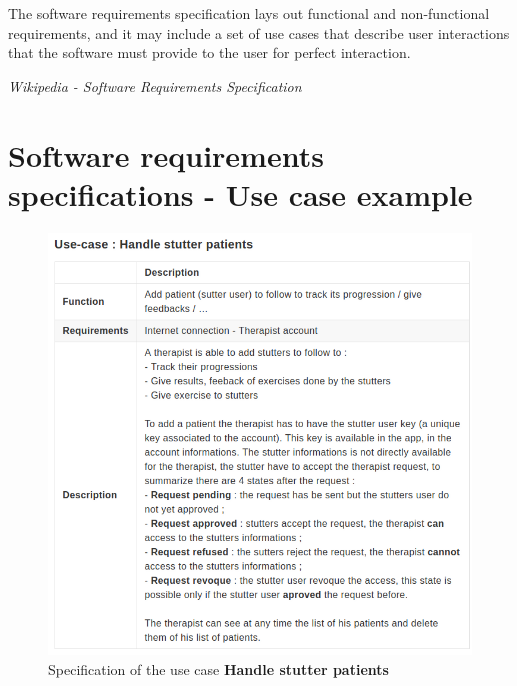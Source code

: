 \begin{appendices}
\begin{displayquote}
The software requirements specification lays out functional and non-functional requirements, and it may include a set of use cases that describe user interactions that the software must provide to the user for perfect interaction.
\end{displayquote}
\hspace*{\fill} \textit{Wikipedia - Software Requirements Specification}



\chapter{Software requirements specifications - Use case example}
\label{appendix:srs_example}
\begin{figure}[h]
  \includegraphics[width=1\linewidth]{content/imgs/srs_use_case_ex.png}
  \caption*{Specification of the use case \textbf{Handle stutter patients}}
\end{figure}




\begin{landscape}
  \label{appendix:gantt}

\end{landscape}
\end{appendices}

